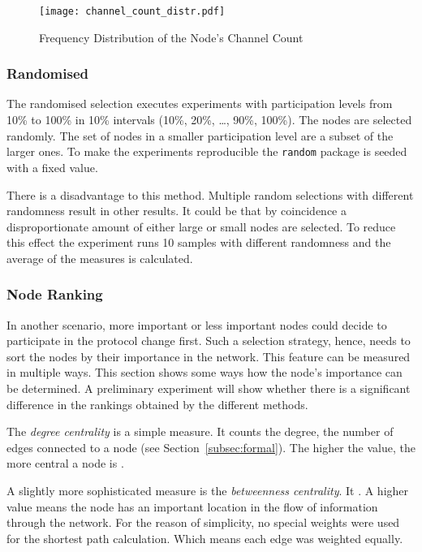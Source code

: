 \documentclass[final]{fhnwreport}       %
\begin{document}
\begin{figure}[H]
\centering
\texttt{[image: channel\_count\_distr.pdf]}
\caption{Frequency Distribution of the Node's Channel Count}
\label{fig:channelcount}
\end{figure}

\subsubsection{Randomised}
The randomised selection executes experiments with participation levels from 10\% to 100\% in 10\% intervals (10\%, 20\%, \ldots, 90\%, 100\%). The nodes are selected randomly. The set of nodes in a smaller participation level are a subset of the larger ones. To make the experiments reproducible the \texttt{random} package is seeded with a fixed value.

There is a disadvantage to this method. Multiple random selections with different randomness result in other results. It could be that by coincidence a disproportionate amount of either large or small nodes are selected. To reduce this effect the experiment runs 10 samples with different randomness and the average of the measures is calculated. 

\subsubsection{Node Ranking}
In another scenario, more important or less important nodes could decide to participate in the protocol change first. Such a selection strategy, hence, needs to sort the nodes by their importance in the network. This feature can be measured in multiple ways. This section shows some ways how the node's importance can be determined. A preliminary experiment will show whether there is a significant difference in the rankings obtained by the different methods.

The \emph{degree centrality} is a simple measure. It counts the degree, the number of edges connected to a node (see Section~\ref{subsec:formal}). The higher the value, the more central a node is \citep{golbeck_analyzing_2013}.

A slightly more sophisticated measure is the \emph{betweenness centrality}. It . A higher value means the node has an important location in the flow of information through the network. For the reason of simplicity, no special weights were used for the shortest path calculation. Which means each edge was weighted equally.
\end{document}
